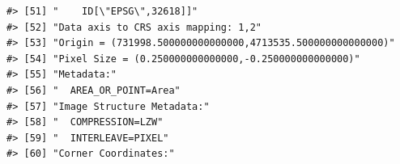 \documentclass[
]{book}
\begin{document}
\begin{verbatim}
#> [51] "    ID[\"EPSG\",32618]]"                                                                                                                                                                                                                                                        
#> [52] "Data axis to CRS axis mapping: 1,2"                                                                                                                                                                                                                                             
#> [53] "Origin = (731998.500000000000000,4713535.500000000000000)"                                                                                                                                                                                                                      
#> [54] "Pixel Size = (0.250000000000000,-0.250000000000000)"                                                                                                                                                                                                                            
#> [55] "Metadata:"                                                                                                                                                                                                                                                                      
#> [56] "  AREA_OR_POINT=Area"                                                                                                                                                                                                                                                           
#> [57] "Image Structure Metadata:"                                                                                                                                                                                                                                                      
#> [58] "  COMPRESSION=LZW"                                                                                                                                                                                                                                                              
#> [59] "  INTERLEAVE=PIXEL"                                                                                                                                                                                                                                                             
#> [60] "Corner Coordinates:"                                                                                                                                                                                                                                                            

\end{verbatim}
\end{document}

